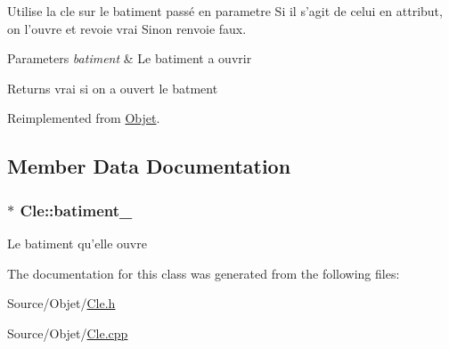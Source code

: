 Utilise la cle sur le batiment passé en parametre Si il s'agit de celui en attribut, on l'ouvre et revoie vrai Sinon renvoie faux. 


\begin{DoxyParams}{Parameters}
{\em batiment} & Le batiment a ouvrir \\
\hline
\end{DoxyParams}
\begin{DoxyReturn}{Returns}
vrai si on a ouvert le batment 
\end{DoxyReturn}


Reimplemented from \hyperlink{classObjet_aa42120788671add668e0c607aaea0f8b}{Objet}.



\subsection{Member Data Documentation}
\hypertarget{classCle_ae612acad66ff96e67edad910c03c1354}{
\subsubsection[{batiment\-\_\-}]{$\ast$ Cle\-::batiment\-\_\-\hspace{0.3cm}{\ttfamily [private]}}}\label{classCle_ae612acad66ff96e67edad910c03c1354}
Le batiment qu'elle ouvre 

The documentation for this class was generated from the following files\-:\begin{DoxyCompactItemize}
\item 
Source/\-Objet/\hyperlink{Cle_8h}{Cle.\-h}\item 
Source/\-Objet/\hyperlink{Cle_8cpp}{Cle.\-cpp}\end{DoxyCompactItemize}
